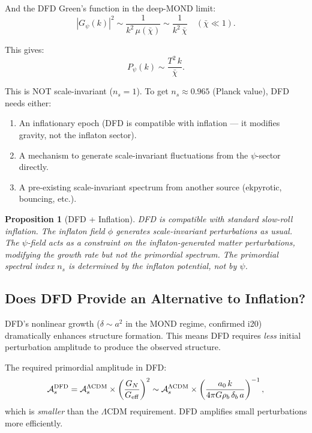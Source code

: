 \documentclass[11pt,a4paper]{article}
\newtheorem{proposition}{Proposition}
\begin{document}
And the DFD Green's function in the deep-MOND limit:
\begin{equation}
|G_\psi(k)|^2 \sim \frac{1}{k^2\,\mu(\bar\chi)}
\sim \frac{1}{k^2\,\bar\chi}\quad(\bar\chi \ll 1).
\end{equation}

This gives:
\begin{equation}
P_\psi(k) \sim \frac{T^2\,k}{\bar\chi}.
\end{equation}

This is NOT scale-invariant ($n_s = 1$). To get $n_s \approx 0.965$ (Planck value), DFD needs either:
\begin{enumerate}
\item An inflationary epoch (DFD is compatible with inflation --- it modifies gravity, not the inflaton sector).
\item A mechanism to generate scale-invariant fluctuations from the $\psi$-sector directly.
\item A pre-existing scale-invariant spectrum from another source (ekpyrotic, bouncing, etc.).
\end{enumerate}

\begin{proposition}[DFD + Inflation]
DFD is compatible with standard slow-roll inflation. The inflaton field $\phi$ generates scale-invariant perturbations as usual. The $\psi$-field acts as a constraint on the inflaton-generated matter perturbations, modifying the growth rate but not the primordial spectrum. The primordial spectral index $n_s$ is determined by the inflaton potential, not by $\psi$.
\end{proposition}

\subsection{Does DFD Provide an Alternative to Inflation?}
\label{sec:alternative-inflation}

DFD's nonlinear growth ($\delta \sim a^2$ in the MOND regime, confirmed i20) dramatically enhances structure formation. This means DFD requires \emph{less} initial perturbation amplitude to produce the observed structure.

The required primordial amplitude in DFD:
\begin{equation}
\mathcal{A}_s^{\rm DFD} = \mathcal{A}_s^{\Lambda\text{CDM}} \times \left(\frac{G_N}{G_{\rm eff}}\right)^2
\sim \mathcal{A}_s^{\Lambda\text{CDM}} \times \left(\frac{a_0\,k}{4\pi G\rho_b\,\delta_b\,a}\right)^{-1},
\end{equation}
which is \emph{smaller} than the $\Lambda$CDM requirement. DFD amplifies small perturbations more efficiently.
\end{document}
